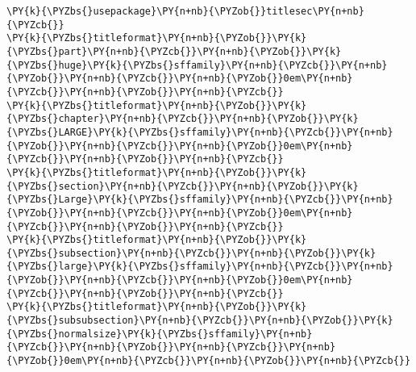\begin{Verbatim}[commandchars=\\\{\}]
\PY{k}{\PYZbs{}usepackage}\PY{n+nb}{\PYZob{}}titlesec\PY{n+nb}{\PYZcb{}}
\PY{k}{\PYZbs{}titleformat}\PY{n+nb}{\PYZob{}}\PY{k}{\PYZbs{}part}\PY{n+nb}{\PYZcb{}}\PY{n+nb}{\PYZob{}}\PY{k}{\PYZbs{}huge}\PY{k}{\PYZbs{}sffamily}\PY{n+nb}{\PYZcb{}}\PY{n+nb}{\PYZob{}}\PY{n+nb}{\PYZcb{}}\PY{n+nb}{\PYZob{}}0em\PY{n+nb}{\PYZcb{}}\PY{n+nb}{\PYZob{}}\PY{n+nb}{\PYZcb{}}
\PY{k}{\PYZbs{}titleformat}\PY{n+nb}{\PYZob{}}\PY{k}{\PYZbs{}chapter}\PY{n+nb}{\PYZcb{}}\PY{n+nb}{\PYZob{}}\PY{k}{\PYZbs{}LARGE}\PY{k}{\PYZbs{}sffamily}\PY{n+nb}{\PYZcb{}}\PY{n+nb}{\PYZob{}}\PY{n+nb}{\PYZcb{}}\PY{n+nb}{\PYZob{}}0em\PY{n+nb}{\PYZcb{}}\PY{n+nb}{\PYZob{}}\PY{n+nb}{\PYZcb{}}
\PY{k}{\PYZbs{}titleformat}\PY{n+nb}{\PYZob{}}\PY{k}{\PYZbs{}section}\PY{n+nb}{\PYZcb{}}\PY{n+nb}{\PYZob{}}\PY{k}{\PYZbs{}Large}\PY{k}{\PYZbs{}sffamily}\PY{n+nb}{\PYZcb{}}\PY{n+nb}{\PYZob{}}\PY{n+nb}{\PYZcb{}}\PY{n+nb}{\PYZob{}}0em\PY{n+nb}{\PYZcb{}}\PY{n+nb}{\PYZob{}}\PY{n+nb}{\PYZcb{}}
\PY{k}{\PYZbs{}titleformat}\PY{n+nb}{\PYZob{}}\PY{k}{\PYZbs{}subsection}\PY{n+nb}{\PYZcb{}}\PY{n+nb}{\PYZob{}}\PY{k}{\PYZbs{}large}\PY{k}{\PYZbs{}sffamily}\PY{n+nb}{\PYZcb{}}\PY{n+nb}{\PYZob{}}\PY{n+nb}{\PYZcb{}}\PY{n+nb}{\PYZob{}}0em\PY{n+nb}{\PYZcb{}}\PY{n+nb}{\PYZob{}}\PY{n+nb}{\PYZcb{}}
\PY{k}{\PYZbs{}titleformat}\PY{n+nb}{\PYZob{}}\PY{k}{\PYZbs{}subsubsection}\PY{n+nb}{\PYZcb{}}\PY{n+nb}{\PYZob{}}\PY{k}{\PYZbs{}normalsize}\PY{k}{\PYZbs{}sffamily}\PY{n+nb}{\PYZcb{}}\PY{n+nb}{\PYZob{}}\PY{n+nb}{\PYZcb{}}\PY{n+nb}{\PYZob{}}0em\PY{n+nb}{\PYZcb{}}\PY{n+nb}{\PYZob{}}\PY{n+nb}{\PYZcb{}}
\end{Verbatim}
